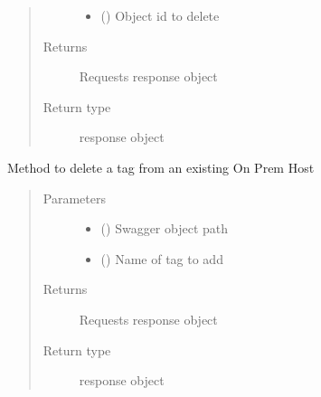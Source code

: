 \documentclass[letterpaper,10pt,english]{sphinxmanual}
\begin{document}
\begin{fulllineitems}
\begin{fulllineitems}
\begin{quote}
\begin{description}
\begin{itemize}
\item {} 
\sphinxAtStartPar
{} () \textendash{} Object id to delete

\end{itemize}

\item[{Returns}] \leavevmode
\sphinxAtStartPar
Requests response object

\item[{Return type}] \leavevmode
\sphinxAtStartPar
response object

\end{description}\end{quote}

\end{fulllineitems}


\begin{fulllineitems}
\label{\detokenize{b1ddi-class:bloxone.b1ddi.delete_tag}}
\sphinxAtStartPar
Method to delete a tag from an existing On Prem Host
\begin{quote}\begin{description}
\item[{Parameters}] \leavevmode\begin{itemize}
\item {} 
\sphinxAtStartPar
{} () \textendash{} Swagger object path

\item {} 
\sphinxAtStartPar
{} () \textendash{} Name of tag to add

\end{itemize}

\item[{Returns}] \leavevmode
\sphinxAtStartPar
Requests response object

\item[{Return type}] \leavevmode
\sphinxAtStartPar
response object


\end{description}
\end{quote}
\end{fulllineitems}
\end{fulllineitems}
\end{document}
